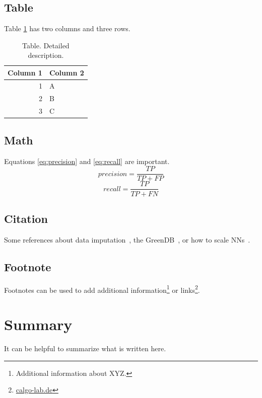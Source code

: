 \subsection{Table}
\label{sec:methodology:example:table}
%
Table \ref{tab:example-table} has two columns and three rows.

\begin{table}[h]
	\centering
	\begin{tabular}{rl}
		\toprule
		Column 1 & Column 2 \\
		\midrule
		1        & A        \\
		2        & B        \\
		3        & C        \\
		\bottomrule
	\end{tabular}
	\caption{Table. Detailed description.}
	\label{tab:example-table}
\end{table}


\subsection{Math}
\label{sec:methodology:example:math}
%
Equations \ref{eq:precision} and \ref{eq:recall} are important.
%
\begin{equation}
	precision = \frac{TP}{TP + FP}
	\label{eq:precision}
\end{equation}
%
\begin{equation}
	recall = \frac{TP}{TP + FN}
	\label{eq:recall}
\end{equation}
%


\subsection{Citation}
\label{sec:methodology:example:citation}
%
Some references about data imputation~\cite{jagerBenchmarkDataImputation2021}, the GreenDB~\cite{jagerGreenDBDatasetBenchmark2022, jagerGreenDBProductbyProductSustainability2022, gossenNudgingSustainableConsumption2022}, or how to scale \glspl{NN}~\cite{jagerParallelizedTrainingDeep2018}.


\subsection{Footnote}
\label{sec:methodology:example:footnote}
%
Footnotes can be used to add additional information\footnote{Additional information about XYZ.} or links\footnote{\url{calgo-lab.de}}.


\section{Summary}
\label{sec:methodology:summary}

It can be helpful to summarize what is written here.